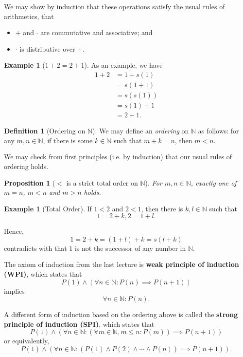 \documentclass{article}
\newtheorem{proposition}[theorem]{Proposition}
\theoremstyle{definition}
\newtheorem{definition}[theorem]{Definition}
\newtheorem{example}[theorem]{Example}
\theoremstyle{remark}
\newcommand{\pqty}[1]{\left(#1\right)}
\newcommand{\NN}{\mathbb{N}}
\begin{document}
We may show by induction that these operations satisfy the usual rules of arithmetics, that
\begin{itemize}
    \item \(+\) and \(\cdot\) are commutative and associative; and
    \item \(\cdot\) is distributive over \(+\).
\end{itemize}

\begin{example}[\(1 + 2 = 2 + 1\)]
    As an example, we have
    \begin{align*}
        1 + 2 &= 1 + s\pqty{1} \\
        &= s\pqty{1 + 1} \\
        &= s\pqty{s\pqty{1}} \\
        &= s\pqty{1} + 1 \\
        &= 2 + 1.
    \end{align*}
\end{example}

\begin{definition}[Ordering on \(\NN\)]
    We may define an \emph{ordering} on \(\NN\) as follows: for any \(m, n \in \NN\), if there is some \(k \in \NN\) such that \(m + k = n\), then \(m < n\).
\end{definition}

We may check from first principles (i.e. by induction) that our usual rules of ordering holds.

\begin{proposition}[\(<\) is a strict total order on \(\NN\)]
    For \(m, n \in \NN\), exactly one of \(m = n\), \(m < n\) and \(m > n\) holds.
\end{proposition}

\begin{example}[Total Order]
    If \(1 < 2\) and \(2 < 1\), then there is \(k, l \in \NN\) such that
    \[
        1 = 2 + k, 2 = 1 + l.
    \]

    Hence,
    \[
        1 = 2 + k = \pqty{1 + l} + k = s\pqty{l + k}
    \]
    contradicts with that \(1\) is not the successor of any number in \(\NN\).
\end{example}

The axiom of induction from the last lecture is \textbf{weak principle of induction (WPI)}, which states that
\[
    P\pqty{1} \land \pqty{\forall n \in \NN: P\pqty{n} \implies P\pqty{n + 1}}
\]
implies
\[
    \forall n \in \NN: P\pqty{n}.
\]

A different form of induction based on the ordering above is called the \textbf{strong principle of induction (SPI)}, which states that
\[
    P\pqty{1} \land \pqty{\forall n \in \NN: \pqty{\forall m \in \NN, m \leq n: P\pqty{m}} \implies P\pqty{n + 1}}
\]
or equivalently,
\[
    P\pqty{1} \land \pqty{\forall n \in \NN: \pqty{P\pqty{1} \land P\pqty{2} \land \cdots \land P\pqty{n}} \implies P\pqty{n + 1}}.
\]
\end{document}

